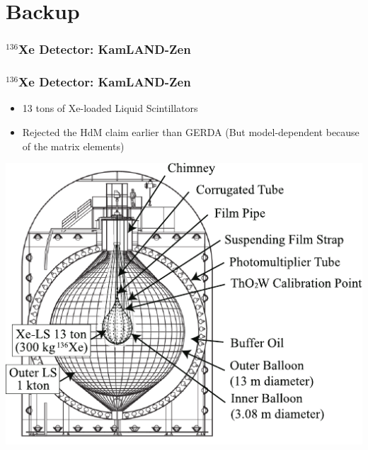 \section*{Backup}
\begin{frame}
	\frametitle{${}^{136}$Xe Detector:  KamLAND-Zen}
		
\end{frame}
\begin{frame}
	\frametitle{${}^{136}$Xe Detector:  KamLAND-Zen}
	\begin{itemize}
		\item 13 tons of Xe-loaded Liquid Scintillators
		\item Rejected the HdM claim earlier than GERDA (But model-dependent because of the matrix elements)	
	\end{itemize}
	\includegraphics[width=.5\textwidth]{media/kamland.pdf}	
\end{frame}
